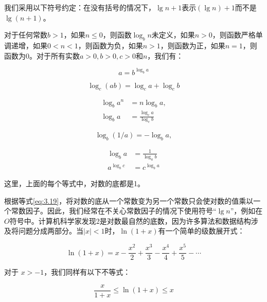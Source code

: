 \documentclass[lang=cn,newtx,10pt,scheme=chinese]{elegantbook}
\begin{document}
我们采用以下符号约定：在没有括号的情况下，$\lg n+1$表示$(\lg n)+1$而不是$\lg (n+1)$。

对于任何常数$b>1$，如果$n \leq 0$，则函数$\log _b n$未定义，如果$n>0$，则函数严格单调递增，如果$0<n<1$，则函数为负，如果$n>1$，则函数为正，如果$n=1$，则函数为0。对于所有实数$a>0, b>0, c>0$和$n$，我们有：

\begin{equation}\label{eq:3.17}
a=b^{\log _b a}
\end{equation}

\begin{equation}\label{eq:3.18}
\log _c(a b)=\log _c a+\log _c b
\end{equation}

\begin{equation}\label{eq:3.19}
\begin{aligned}
\log _b a^n&=n \log _b a, \\
\log _b a&=\frac{\log _c a}{\log _c b}
\end{aligned}
\end{equation}

\begin{equation}\label{eq:3.20}
\log _b(1 / a)=-\log _b a,
\end{equation}

\begin{equation}\label{eq:3.21}
\begin{aligned}
\log _b a &= \frac{1}{\log _a b} \\
a^{\log _b c} &= c^{\log _b a}
\end{aligned}
\end{equation}

这里，上面的每个等式中，对数的底都是1。

根据等式\eqref{eq:3.19}，将对数的底从一个常数变为另一个常数只会使对数的值乘以一个常数因子。因此，我们经常在不关心常数因子的情况下使用符号“$\lg n$”，例如在$O$符号中。计算机科学家发现2是对数最自然的底数，因为许多算法和数据结构涉及将问题分成两部分。当$|x|<1$时，$\ln (1+x)$有一个简单的级数展开式：

\begin{equation}\label{eq:3.22}
\ln (1+x)=x-\frac{x^2}{2}+\frac{x^3}{3}-\frac{x^4}{4}+\frac{x^5}{5}-\cdots
\end{equation}

对于 $x>-1$，我们同样有以下不等式：

\begin{equation}\label{eq:3.23}
\frac{x}{1+x} \leq \ln (1+x) \leq x
\end{equation}
\end{document}
